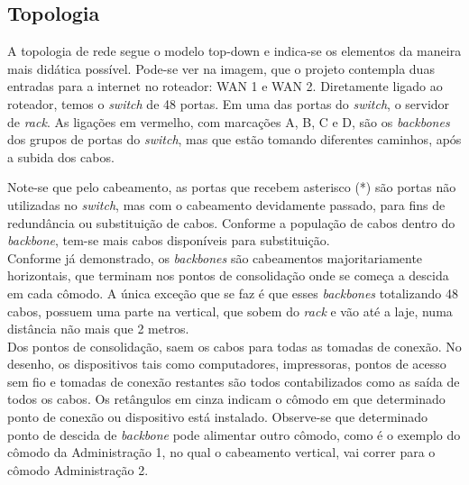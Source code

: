 \documentclass[	DIV=calc,%
							paper=a4,%
							fontsize=12pt,%
							onecolumn]{scrartcl}	 					%
\begin{document}
\clearpage
{}
\recalctypearea











\subsection{Topologia}

A topologia de rede segue o modelo top-down e indica-se os elementos da maneira mais didática possível. Pode-se ver na imagem, que o projeto contempla duas entradas para a internet no roteador: WAN 1 e WAN 2. Diretamente ligado ao roteador, temos o \textit{switch} de 48 portas. Em uma das portas do \textit{switch}, o servidor de \textit{rack}. As ligações em vermelho, com marcações A, B, C e D, são os \textit{backbones} dos grupos de portas do \textit{switch}, mas que estão tomando diferentes caminhos, após a subida dos cabos.





Note-se que pelo cabeamento, as portas que recebem asterisco (*) são portas não utilizadas no \textit{switch}, mas com o cabeamento devidamente passado, para fins de redundância ou substituição de cabos. Conforme a população de cabos dentro do \textit{backbone}, tem-se mais cabos disponíveis para substituição.
\\

Conforme já demonstrado, os \textit{backbones} são cabeamentos majoritariamente horizontais, que terminam nos pontos de consolidação onde se começa a descida em cada cômodo. A única exceção que se faz é que esses \textit{backbones} totalizando 48 cabos, possuem uma parte na vertical, que sobem do \textit{rack} e vão até a laje, numa distância não mais que 2 metros.
\\

Dos pontos de consolidação, saem os cabos para todas as tomadas de conexão. No desenho, os dispositivos tais como computadores, impressoras, pontos de acesso sem fio e tomadas de conexão restantes são todos contabilizados como as saída de todos os cabos. Os retângulos em cinza indicam o cômodo em que determinado ponto de conexão ou dispositivo está instalado. Observe-se que determinado ponto de descida de \textit{backbone} pode alimentar outro cômodo, como é o exemplo do cômodo da Administração 1, no qual o cabeamento vertical, vai correr para o cômodo Administração 2.
\\
\end{document}
